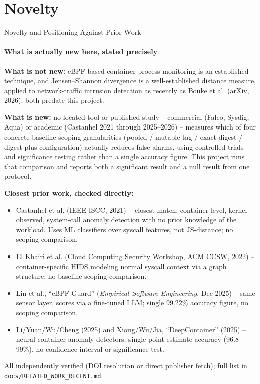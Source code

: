 \documentclass[aspectratio=169, 11pt]{beamer}
\begin{document}
\section{Novelty}
\begin{frame}{Novelty and Positioning Against Prior Work}
\framesubtitle{What is actually new here, stated precisely}
\scriptsize

\textbf{What is not new:} eBPF-based container process monitoring is an
established technique, and Jensen--Shannon divergence is a well-established
distance measure, applied to network-traffic intrusion detection as
recently as Bouke et al. (arXiv, 2026); both predate this project.

\medskip
\textbf{What is new:} no located tool or published study -- commercial
(Falco, Sysdig, Aqua) or academic (Castanhel 2021 through 2025--2026) --
measures which of four concrete baseline-scoping granularities (pooled /
mutable-tag / exact-digest / digest-plus-configuration) actually reduces
false alarms, using controlled trials and significance testing rather
than a single accuracy figure. This project runs that comparison and
reports both a significant result and a null result from one protocol.

\medskip
\textbf{Closest prior work, checked directly:}
\begin{itemize}
    \setlength{\itemsep}{1pt}
    \item Castanhel et al. (IEEE ISCC, 2021) -- closest match: container-level,
    kernel-observed, system-call anomaly detection with no prior knowledge
    of the workload. Uses ML classifiers over syscall features, not
    JS-distance; no scoping comparison.
    \item El Khairi et al. (Cloud Computing Security Workshop, ACM CCSW,
    2022) -- container-specific HIDS modeling normal syscall context via a
    graph structure; no baseline-scoping comparison.
    \item Lin et al., ``eBPF-Guard'' (\emph{Empirical Software Engineering},
    Dec 2025) -- same sensor layer, scores via a fine-tuned LLM; single
    99.22\% accuracy figure, no scoping comparison.
    \item Li/Yuan/Wu/Cheng (2025) and Xiong/Wu/Jia, ``DeepContainer''
    (2025) -- neural container anomaly detectors, single point-estimate
    accuracy (96.8--99\%), no confidence interval or significance test.
\end{itemize}
All independently verified (DOI resolution or direct publisher fetch);
full list in \texttt{docs/RELATED\_WORK\_RECENT.md}.
\end{frame}
\end{document}
